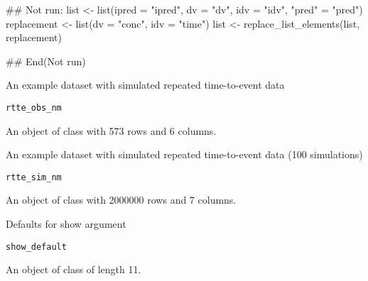 \documentclass[letterpaper]{book}
\begin{document}
%
\begin{Examples}
\begin{ExampleCode}
## Not run: 
list <- list(ipred = "ipred", dv = "dv", idv = "idv", "pred" = "pred")
replacement <- list(dv = "conc", idv = "time")
list <- replace_list_elements(list, replacement)

## End(Not run)
\end{ExampleCode}
\end{Examples}
%
\begin{Description}\relax
An example dataset with simulated repeated time-to-event data
\end{Description}
%
\begin{Usage}
\begin{verbatim}
rtte_obs_nm
\end{verbatim}
\end{Usage}
%
\begin{Format}
An object of class  with 573 rows and 6 columns.
\end{Format}
%
\begin{Description}\relax
An example dataset with simulated repeated time-to-event data (100 simulations)
\end{Description}
%
\begin{Usage}
\begin{verbatim}
rtte_sim_nm
\end{verbatim}
\end{Usage}
%
\begin{Format}
An object of class  with 2000000 rows and 7 columns.
\end{Format}
%
\begin{Description}\relax
Defaults for show argument
\end{Description}
%
\begin{Usage}
\begin{verbatim}
show_default
\end{verbatim}
\end{Usage}
%
\begin{Format}
An object of class  of length 11.
\end{Format}
\end{document}
